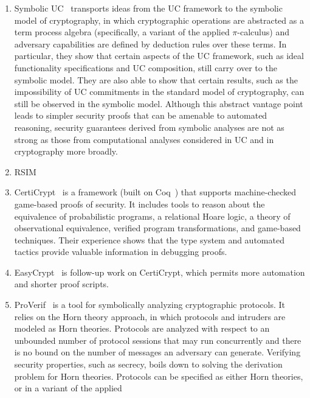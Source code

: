 \begin{enumerate}[leftmargin=*]
  \item Symbolic UC~\cite{bohl2016symbolic} transports ideas from the UC
    framework to the symbolic model of cryptography, in which cryptographic
    operations are abstracted as a term process algebra (specifically, a variant
    of the applied $\pi$-calculus) and adversary capabilities are defined by
    deduction rules over these terms. In particular, they show that certain
    aspects of the UC framework, such as ideal functionality specifications and
    UC composition, still carry over to the symbolic model. They are also able
    to show that certain results, such as the impossibility of UC commitments in
    the standard model of cryptography, can still be observed in the symbolic
    model. Although this abstract vantage point leads to simpler security proofs
    that can be amenable to automated reasoning, security guarantees derived
    from symbolic analyses are not as strong as those from computational
    analyses considered in UC and in cryptography more broadly.
  \item RSIM~\cite{backes2007reactive}
  \item CertiCrypt~\cite{barthe2009formal} is a framework (built on
    Coq~\cite{barras1997coq}) that supports machine-checked game-based proofs of
    security. It includes tools to reason about the equivalence of probabilistic
    programs, a relational Hoare logic, a theory of observational equivalence,
    verified program transformations, and game-based techniques.  Their
    experience shows that the type system and automated tactics provide valuable
    information in debugging proofs.
  \item EasyCrypt~\cite{barthe2011computer} is follow-up work on CertiCrypt,
    which permits more automation and shorter proof scripts. 
  \item ProVerif~\cite{blanchet2010proverif} is a tool for symbolically
    analyzing cryptographic protocols. It relies on the Horn theory approach, in
    which protocols and intruders are modeled as Horn theories. Protocols are
    analyzed with respect to an unbounded number of protocol sessions that may
    run concurrently and there is no bound on the number of messages an
    adversary can generate. Verifying security properties, such as secrecy,
    boils down to solving the derivation problem for Horn theories. Protocols
    can be specified as either Horn theories, or in a variant of the applied

\end{enumerate}
